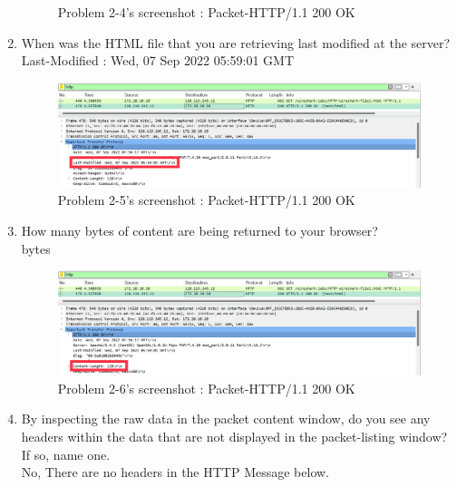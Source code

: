 \begin{enumerate}[label=\bfseries Problem \arabic*:,leftmargin=*,labelindent=1em]
\begin{figure}[!h]
        		\caption{\footnotesize Problem 2-4's screenshot : Packet-HTTP/1.1 200 OK}
        		\vspace{-10pt}
            \end{figure}            
        \item When was the HTML file that you are retrieving last modified at the server? \\[0.2mm]
            \soln Last-Modified : Wed, 07 Sep 2022 05:59:01 GMT
            \vspace{-2mm}  
            \begin{figure}[!h]\centering
        		\includegraphics[width=.79\textwidth]{image/result_week01/Q2-5.png}
        		\caption{\footnotesize Problem 2-5's screenshot : Packet-HTTP/1.1 200 OK}
        		\vspace{-10pt}
            \end{figure}            
        \item How many bytes of content are being returned to your browser? \\[0.2mm]
             bytes
            \vspace{-2mm}  
            \begin{figure}[!h]\centering
        		\includegraphics[width=.79\textwidth]{image/result_week01/Q2-6.png}
        		\caption{\footnotesize Problem 2-6's screenshot : Packet-HTTP/1.1 200 OK}
        		\vspace{-10pt}
            \end{figure}            
        \item By inspecting the raw data in the packet content window, 
        do you see any headers within the data that are not displayed in the packet-listing window?
        If so, name one.\\[0.2mm]
            \soln No, There are no headers in the HTTP Message below.
            
\newpage
    \end{enumerate}
